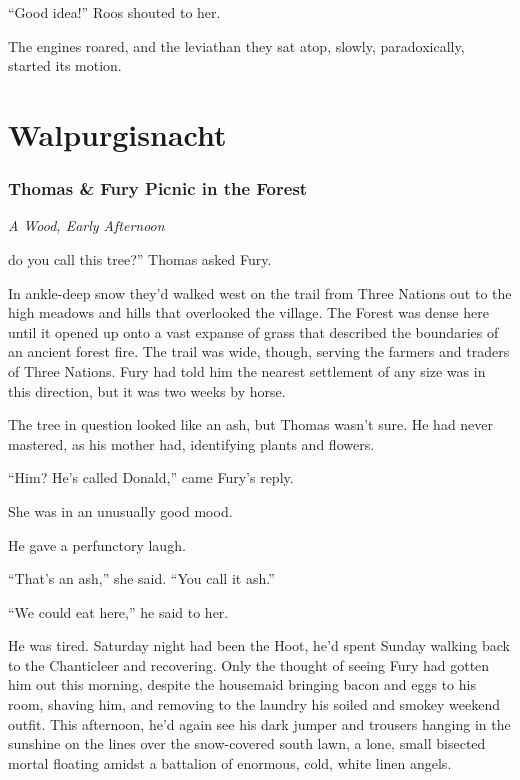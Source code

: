 \documentclass[11pt,a5paper]{article}
\newcommand{\alet}[1]{\textit{#1}\vspace{1em}}
\begin{document}
``Good idea!'' Roos shouted to her.

The engines roared, and the leviathan they sat atop, slowly, paradoxically, started its motion.

\newpage

\part{Walpurgisnacht}

\newpage

\section{Thomas \& Fury Picnic in the Forest}

\alet{A Wood, Early Afternoon}

 do you call this tree?'' Thomas asked Fury.

In ankle-deep snow they'd walked west on the trail from Three Nations out to the high meadows and hills that overlooked the village. The Forest was dense here until it opened up onto a vast expanse of grass that described the boundaries of an ancient forest fire. The trail was wide, though, serving the farmers and traders of Three Nations. Fury had told him the nearest settlement of any size was in this direction, but it was two weeks by horse.

The tree in question looked like an ash, but Thomas wasn't sure. He had never mastered, as his mother had, identifying plants and flowers.

``Him? He's called Donald,'' came Fury's reply.

She was in an unusually good mood.

He gave a perfunctory laugh.

``That's an ash,'' she said. ``You call it ash.''

``We could eat here,'' he said to her.

He was tired. Saturday night had been the Hoot, he'd spent Sunday walking back to the Chanticleer and recovering. Only the thought of seeing Fury had gotten him out this morning, despite the housemaid bringing bacon and eggs to his room, shaving him, and removing to the laundry his soiled and smokey weekend outfit. This afternoon, he'd again see his dark jumper and trousers hanging in the sunshine on the lines over the snow-covered south lawn, a lone, small bisected mortal floating amidst a battalion of enormous, cold, white linen angels.
\end{document}
